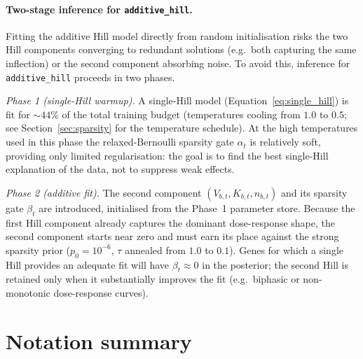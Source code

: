\documentclass[12pt]{article}
\begin{document}
\paragraph{Two-stage inference for \texttt{additive\_hill}.}

Fitting the additive Hill model directly from random initialisation risks the two
Hill components converging to redundant solutions (e.g.\ both capturing the same
inflection) or the second component absorbing noise.
To avoid this, inference for \texttt{additive\_hill} proceeds in two phases.

\textit{Phase 1 (single-Hill warmup).}
A single-Hill model (Equation~\ref{eq:single_hill}) is fit for
$\sim\!44\%$ of the total training budget (temperatures cooling from $1.0$ to $0.5$;
see Section~\ref{sec:sparsity} for the temperature schedule).
At the high temperatures used in this phase the relaxed-Bernoulli sparsity gate $\alpha_t$
is relatively soft, providing only limited regularisation: the goal is to find the
best single-Hill explanation of the data, not to suppress weak effects.

\textit{Phase 2 (additive fit).}
The second component $(V_{b,t}, K_{b,t}, n_{b,t})$ and its sparsity gate $\beta_t$ are
introduced, initialised from the Phase~1 parameter store.
Because the first Hill component already captures the dominant dose-response shape,
the second component starts near zero and must earn its place against the strong
sparsity prior ($p_0 = 10^{-6}$, $\tau$ annealed from $1.0$ to $0.1$).
Genes for which a single Hill provides an adequate fit will have $\beta_t \approx 0$
in the posterior; the second Hill is retained only when it substantially improves
the fit (e.g.\ biphasic or non-monotonic dose-response curves).

\section{Notation summary}
\end{document}

